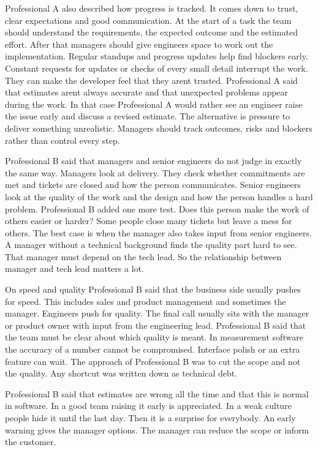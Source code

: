 \documentclass[conference]{IEEEtran}
\begin{document}
Professional A also described how progress is tracked. It comes down to trust, clear expectations and good communication. At the start of a task the team should understand the requirements, the expected outcome and the estimated effort. After that managers should give engineers space to work out the implementation. Regular standups and progress updates help find blockers early. Constant requests for updates or checks of every small detail interrupt the work. They can make the developer feel that they arent trusted. Professional A said that estimates arent always accurate and that unexpected problems appear during the work. In that case Professional A would rather see an engineer raise the issue early and discuss a revised estimate. The alternative is pressure to deliver something unrealistic. Managers should track outcomes, risks and blockers rather than control every step.

Professional B said that managers and senior engineers do not judge in exactly the same way. Managers look at delivery. They check whether commitments are met and tickets are closed and how the person communicates. Senior engineers look at the quality of the work and the design and how the person handles a hard problem. Professional B added one more test. Does this person make the work of others easier or harder? Some people close many tickets but leave a mess for others. The best case is when the manager also takes input from senior engineers. A manager without a technical background finds the quality part hard to see. That manager must depend on the tech lead. So the relationship between manager and tech lead matters a lot.

On speed and quality Professional B said that the business side usually pushes for speed. This includes sales and product management and sometimes the manager. Engineers push for quality. The final call usually sits with the manager or product owner with input from the engineering lead. Professional B said that the team must be clear about which quality is meant. In measurement software the accuracy of a number cannot be compromised. Interface polish or an extra feature can wait. The approach of Professional B was to cut the scope and not the quality. Any shortcut was written down as technical debt.

Professional B said that estimates are wrong all the time and that this is normal in software. In a good team raising it early is appreciated. In a weak culture people hide it until the last day. Then it is a surprise for everybody. An early warning gives the manager options. The manager can reduce the scope or inform the customer.
\end{document}

